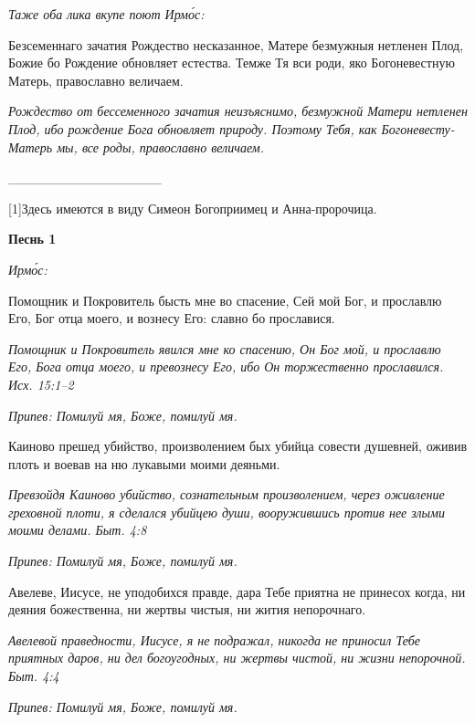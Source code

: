 \itshape Таже оба лика вкупе поют Ирмо́с:\normalfont{}


Безсеменнаго зачатия Рождество несказанное, Матере безмужныя нетленен Плод, Божие бо Рождение обновляет естества. Темже Тя вси роди, яко Богоневестную Матерь, православно величаем.


\itshape Рождество от бессеменного зачатия неизъяснимо, безмужной Матери нетленен Плод, ибо рождение Бога обновляет природу. Поэтому Тебя, как Богоневесту-Матерь мы, все роды, православно величаем.\normalfont{}


________________


[1]Здесь имеются в виду Симеон Богоприимец и Анна-пророчица.


\mychapterending








\bfseries Песнь 1\normalfont{}


\itshape Ирмо́с:\normalfont{}


Помощник и Покровитель бысть мне во спасение, Сей мой Бог, и прославлю Его, Бог отца моего, и вознесу Его: славно бо прославися.


\itshape Помощник и Покровитель явился мне ко спасению, Он Бог мой, и прославлю Его, Бога отца моего, и превознесу Его, ибо Он торжественно прославился. Исх. 15:1–2\normalfont{}


\itshape Припев:\normalfont{} Помилуй мя, Боже, помилуй мя.


Каиново прешед убийство, произволением бых убийца совести душевней, оживив плоть и воевав на ню лукавыми моими деяньми.


\itshape Превзойдя Каиново убийство, сознательным произволением, через оживление греховной плоти, я сделался убийцею души, вооружившись против нее злыми моими делами. Быт. 4:8\normalfont{}


\itshape Припев:\normalfont{} Помилуй мя, Боже, помилуй мя.


Авелеве, Иисусе, не уподобихся правде, дара Тебе приятна не принесох когда, ни деяния божественна, ни жертвы чистыя, ни жития непорочнаго.


\itshape Авелевой праведности, Иисусе, я не подражал, никогда не приносил Тебе приятных даров, ни дел богоугодных, ни жертвы чистой, ни жизни непорочной. Быт. 4:4\normalfont{}


\itshape Припев:\normalfont{} Помилуй мя, Боже, помилуй мя.


